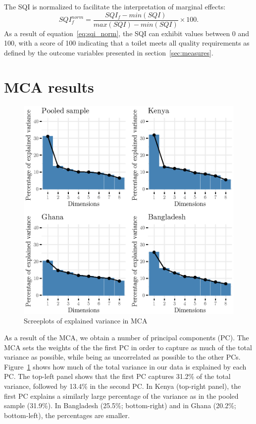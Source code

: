 \documentclass[natbib]{svjour3}                     %
\begin{document}
The SQI is normalized to facilitate the interpretation of marginal effects:
\begin{equation}
\label{eq:sqi_norm}
    SQI_f^{norm} = \frac{SQI_f - min(SQI)}{max(SQI)-min(SQI)} \times 100.
\end{equation}
As a result of equation~\ref{eq:sqi_norm}, the SQI can exhibit values between 0 and 100, with a score of 100 indicating that a toilet meets all quality requirements as defined by the outcome variables presented in section~\ref{sec:measures}.

\section{MCA results}

\begin{figure}[ht]
    \centering
    \includegraphics{figures/scree_pooled.eps}
    \caption{Screeplots of explained variance in MCA}
    \label{fig:scree}
\end{figure}

As a result of the MCA, we obtain a number of principal components (PC). The MCA sets the weights of the the first PC in order to capture as much of the total variance as possible, while being as uncorrelated as possible to the other PCs. Figure~\ref{fig:scree} shows how much of the total variance in our data is explained by each PC. The top-left panel shows that the first PC captures 31.2\% of the total variance, followed by 13.4\% in the second PC. In Kenya (top-right panel), the first PC explains a similarly large percentage of the variance as in the pooled sample (31.9\%). In Bangladesh (25.5\%; bottom-right) and in Ghana (20.2\%; bottom-left), the percentages are smaller. 
\end{document}
